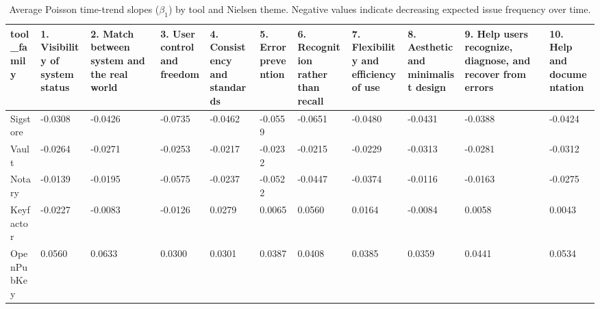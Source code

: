 \begin{table}[t]
\centering
\caption{Average Poisson time-trend slopes ($\beta_1$) by tool and Nielsen theme. Negative values indicate decreasing expected issue frequency over time.}
\label{tab:poisson-avg-beta-tool-nielsen-theme}
\scriptsize
\begin{tabular}{lllllllllll}
\hline
tool\_family & 1. Visibility of system status & 2. Match between system and the real world & 3. User control and freedom & 4. Consistency and standards & 5. Error prevention & 6. Recognition rather than recall & 7. Flexibility and efficiency of use & 8. Aesthetic and minimalist design & 9. Help users recognize, diagnose, and recover from errors & 10. Help and documentation \\
\hline
Sigstore & -0.0308 & -0.0426 & -0.0735 & -0.0462 & -0.0559 & -0.0651 & -0.0480 & -0.0431 & -0.0388 & -0.0424 \\
Vault & -0.0264 & -0.0271 & -0.0253 & -0.0217 & -0.0232 & -0.0215 & -0.0229 & -0.0313 & -0.0281 & -0.0312 \\
Notary & -0.0139 & -0.0195 & -0.0575 & -0.0237 & -0.0522 & -0.0447 & -0.0374 & -0.0116 & -0.0163 & -0.0275 \\
Keyfactor & -0.0227 & -0.0083 & -0.0126 & 0.0279 & 0.0065 & 0.0560 & 0.0164 & -0.0084 & 0.0058 & 0.0043 \\
OpenPubKey & 0.0560 & 0.0633 & 0.0300 & 0.0301 & 0.0387 & 0.0408 & 0.0385 & 0.0359 & 0.0441 & 0.0534 \\
\hline
\end{tabular}
\end{table}
